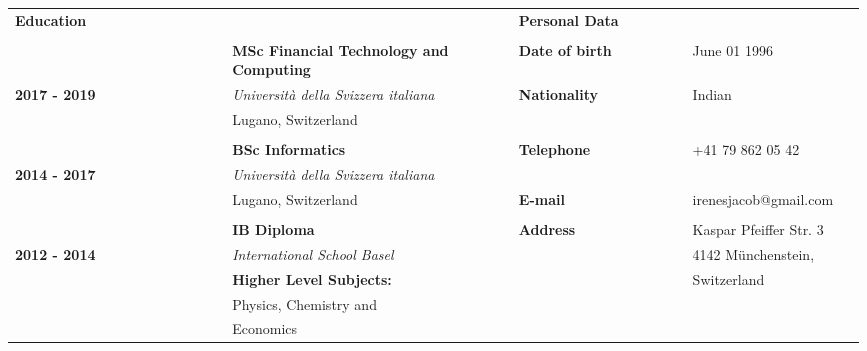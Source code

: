 \noindent
\begin{table}[h]
    \begin{tabular*}{\textwidth}{@{}p{0.25\linewidth}@{}p{0.28\linewidth}@{}p{0.052\linewidth} @{}p{0.20\linewidth}@{}p{0.204\linewidth}}
        {\large\color{mediumpersianblue}\textbf{Education}} &  & & {\large\color{mediumpersianblue}\textbf{Personal Data}} & \\ \arrayrulecolor{gray}\cline{1-2}\cline{4-5}
        \vspace{-0.2cm}
        & & & & \\
        & \textbf{MSc Financial Technology and Computing} & & \textcolor[gray]{0.5}{\textbf{Date of birth}} & June 01 1996 \\
        \textcolor[gray]{0.5}{\textbf{2017 - 2019}} & \textsl{\small Universit\`a della Svizzera italiana} & & \textcolor[gray]{0.5}{\textbf{Nationality}} & Indian  \\
        & {\small Lugano, Switzerland} & & &\\
        & & & & \\
        & \textbf{BSc Informatics} & & \textcolor[gray]{0.5}{\textbf{Telephone}} & +41 79 862 05 42 \\
        \textcolor[gray]{0.5}{\textbf{2014 - 2017}} & \textsl{\small Universit\`a della Svizzera italiana} & & & \\
        & {\small Lugano, Switzerland} & & \textcolor[gray]{0.5}{\textbf{E-mail}} & {\small irenesjacob@gmail.com} \\
        & & & & \\
        & \textbf{IB Diploma} & & \textcolor[gray]{0.5}{\textbf{Address}} & Kaspar Pfeiffer Str. 3 \\
        \textcolor[gray]{0.5}{\textbf{2012 - 2014}} & \textsl{\small International School Basel} & & & 4142 M\"unchenstein,  \\
        & \textcolor[gray]{0.5}{\textbf{\small Higher Level Subjects:}} & & & Switzerland \\
        & {\small Physics, Chemistry and} & & & \\
        & {\small Economics} & & &
    \end{tabular*}
\end{table}

